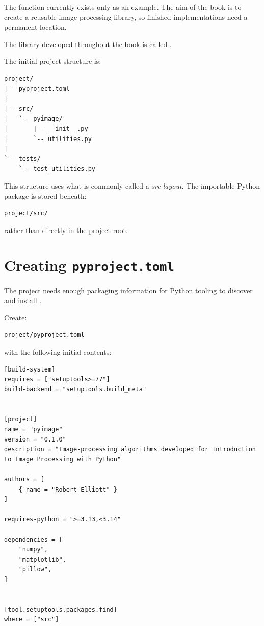 The function currently exists only as an example. The aim of the book
is to create a reusable image-processing library, so finished
implementations need a permanent location.

The library developed throughout the book is called \pyimage{}.

The initial project structure is:

\begin{verbatim}
project/
|-- pyproject.toml
|
|-- src/
|   `-- pyimage/
|       |-- __init__.py
|       `-- utilities.py
|
`-- tests/
    `-- test_utilities.py
\end{verbatim}

This structure uses what is commonly called a \emph{src layout}. The
importable Python package is stored beneath:

\begin{verbatim}
project/src/
\end{verbatim}

rather than directly in the project root.


\section{Creating \texttt{pyproject.toml}}
\label{sec:ch03-pyproject}

The project needs enough packaging information for Python tooling to
discover and install \pyimage{}.

Create:

\begin{verbatim}
project/pyproject.toml
\end{verbatim}

with the following initial contents:

\begin{listing}[htbp]
    \caption{Initial \texttt{pyproject.toml} for \pyimage{}.}
    \label{lst:initial-pyproject}

\begin{verbatim}
[build-system]
requires = ["setuptools>=77"]
build-backend = "setuptools.build_meta"


[project]
name = "pyimage"
version = "0.1.0"
description = "Image-processing algorithms developed for Introduction to Image Processing with Python"

authors = [
    { name = "Robert Elliott" }
]

requires-python = ">=3.13,<3.14"

dependencies = [
    "numpy",
    "matplotlib",
    "pillow",
]


[tool.setuptools.packages.find]
where = ["src"]
\end{verbatim}

\end{listing}

